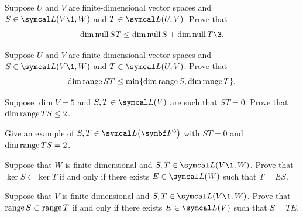 \begin{exercises}
\exercise
Suppose $U$ and $V$ are finite-dimensional vector spaces and
\mbox{$S \in \L(V\1, W)$} and $T \in \L(U, V)$.  Prove that
\[
\dim \ker ST \le \dim \ker S + \dim \ker T\3.
\]
\exercisedisplayend


\exercise  \label{5dimST}
Suppose $U$ and $V$ are finite-dimensional vector spaces and
\mbox{$S \in \L(V\1, W)$} and $T \in \L(U, V)$.  Prove that
\[
\dim \operatorname{range} ST \le \min \{\dim \operatorname{range} S, \dim \operatorname{range} T\}.
\]
\exercisedisplayend


\exercise
\begin{SUBtheorem}
\item
Suppose $\dim V = 5$ and $S, T \in \L(V)$ are such that $ST = 0$. Prove that $\dim \operatorname{range} TS \le 2$.
\item
Give an example of $S, T \in \L\paren[\big]{\F5}$ with $ST = 0$ and $\dim \operatorname{range} TS = 2$.
\end{SUBtheorem}


\exercise\label{kerT1}
Suppose that $W$ is finite-dimensional and $S, T \in \L(V\1, W)$. Prove that $\ker S \subset \ker T$ if and only if there exists $E \in \L(W)$ such that \mbox{$T = E S$}.


\exercise
Suppose that $V$ is finite-dimensional and $S, T \in \L(V\1, W)$. Prove that $\operatorname{range} S \subset \operatorname{range} T$ if and only if there exists $E \in \L(V)$ such that \mbox{$S = T E$}.

\end{exercises}
